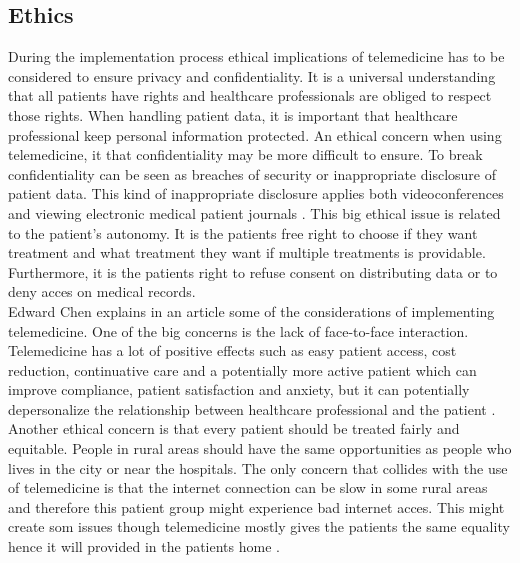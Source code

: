 \subsection{Ethics}

During the implementation process ethical implications of telemedicine has to be considered to ensure privacy and confidentiality. It is a universal understanding that all patients have rights and healthcare professionals are obliged to respect those rights. When handling patient data, it is important that healthcare professional keep personal information protected. An ethical concern when using telemedicine, it that confidentiality may be more difficult to ensure. To break confidentiality can be seen as breaches of security or inappropriate disclosure of patient data. This kind of inappropriate disclosure applies both videoconferences and viewing electronic medical patient journals \cite{etik}. This big ethical issue is related to the patient's autonomy. It is the patients free right to choose if they want treatment and what treatment they want if multiple treatments is providable. Furthermore, it is the patients right to refuse consent on distributing data or to deny acces on medical records. \\

Edward Chen explains in an article some of the considerations of implementing telemedicine. One of the big concerns is the lack of face-to-face interaction. Telemedicine has a lot of positive effects such as easy patient access, cost reduction, continuative care and a potentially more active patient which can improve compliance, patient satisfaction and anxiety, but it can potentially depersonalize the relationship between healthcare professional and the patient \cite{considerations}.\\ 

Another ethical concern is that every patient should be treated fairly and equitable. People in rural areas should have the same opportunities as people who lives in the city or near the hospitals. The only concern that collides with the use of telemedicine is that the internet connection can be slow in some rural areas and therefore this patient group might experience bad internet acces. This might create som issues though telemedicine mostly gives the patients the same equality hence it will provided in the patients home \cite{considerations}. 

